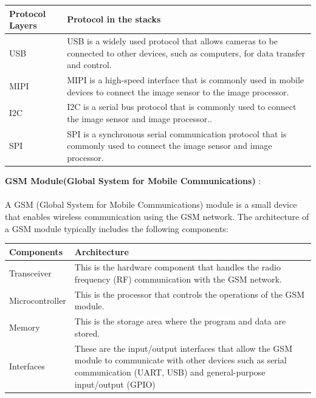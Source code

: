 \documentclass{report}
\begin{document}
\begin{multicols}{1}
{        \begin{tabular}{ | m{6em} | m{5cm} | } 
            \hline
            \textbf Protocol Layers & Protocol in the stacks\\ 
            \hline
             USB & USB is a widely used protocol that allows cameras to be connected to other devices, such as computers, for data transfer and control. \\ 
            \hline
            MIPI & MIPI is a high-speed interface that is commonly used in mobile devices to connect the image sensor to the image processor.\\ 
            \hline
            I2C & I2C is a serial bus protocol that is commonly used to connect the image sensor and image processor..\\
            \hline
            SPI & SPI is a synchronous serial communication protocol that is commonly used to connect the image sensor and image processor.\\
            \hline                
        \end{tabular}

\vspace*{0.3cm}
\textit{}

    \textbf{GSM Module(Global System for Mobile Communications)} : \\ \\
    A GSM (Global System for Mobile Communications) module is a small device that enables wireless communication using the GSM network. The architecture of a GSM module typically includes the following components: \\ 

    \begin{tabular}{ | m{6em} | m{5cm} | } 
            \hline
            \textbf Components  & Architecture\\ 
            \hline
            Transceiver & This is the hardware component that handles the radio frequency (RF) communication with the GSM network. \\ 
            \hline
            Microcontroller & This is the processor that controls the operations of the GSM module.\\ 
            \hline
            Memory & This is the storage area where the program and data are stored.\\
            \hline
            Interfaces &  These are the input/output interfaces that allow the GSM module to communicate with other devices such as serial communication (UART, USB) and general-purpose input/output (GPIO)\\
            \hline
    \end{tabular}

}
\end{multicols}
\end{document}
